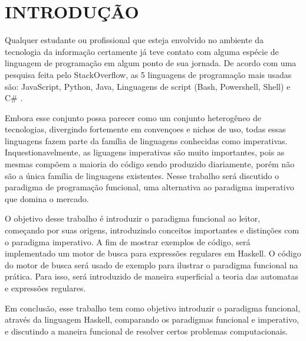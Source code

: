 \section{INTRODUÇÃO}
Qualquer estudante ou profissional que esteja envolvido no ambiente da tecnologia da informação certamente já teve contato com alguma espécie de linguagem de programação em algum ponto de sua jornada.
De acordo com uma pesquisa feita pelo StackOverflow, as 5 linguagens de programação mais usadas são: JavaScript, Python, Java, Linguagens de script (Bash, Powershell, Shell) e C\# \cite{stack-overflow}.

Embora esse conjunto possa parecer como um conjunto heterogêneo de tecnologias, divergindo fortemente em convençoes e nichos de uso, todas essas linguagens fazem parte da família de linguagens conhecidas como imperativas.
Inquestionavelmente, as liguagens imperativas são muito importantes, pois as mesmas compõem a maioria do código sendo produzido diariamente, porém não são a única família de linguagens existentes.
Nesse trabalho será discutido o paradigma de programação funcional, uma alternativa ao paradigma imperativo que domina o mercado.

O objetivo desse trabalho é introduzir o paradigma funcional ao leitor, começando por suas origens, introduzindo conceitos importantes e distinções com o paradigma imperativo.
A fim de mostrar exemplos de código, será implementado um motor de busca para expressões regulares em Haskell.
O código do motor de busca será usado de exemplo para ilustrar o paradigma funcional na prática.
Para isso, será introduzido de maneira superficial a teoria das automatas e expressões regulares.

Em conclusão, esse trabalho tem como objetivo introduzir o paradigma funcional, através da linguagem Haskell, comparando os paradigmas funcional e imperativo, e discutindo a maneira funcional de resolver certos problemas computacionais.
